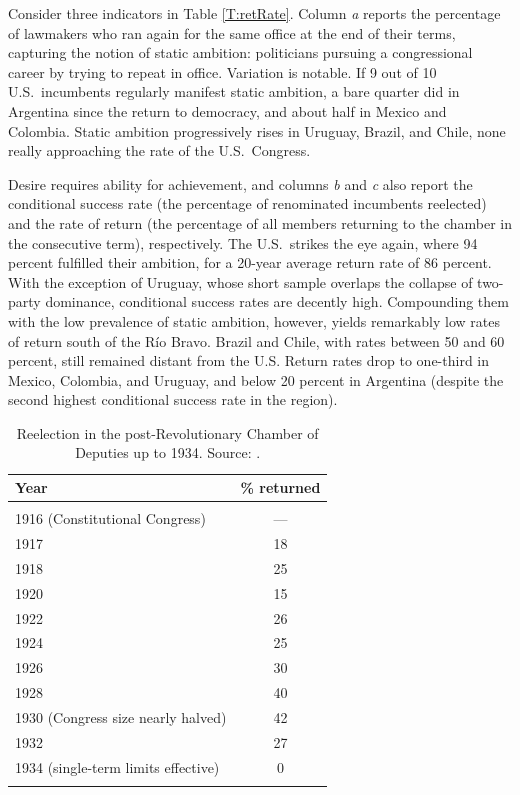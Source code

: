 \documentclass[letter,12pt]{article}
\begin{document}
Consider three indicators in Table \ref{T:retRate}. Column \emph{a} reports the percentage of lawmakers who ran again for the same office at the end of their terms, capturing the notion of static ambition: politicians pursuing a congressional career by trying to repeat in office. Variation is notable. If 9 out of 10 U.S.\ incumbents regularly manifest static ambition, a bare quarter did in Argentina since the return to democracy, and about half in Mexico and Colombia. Static ambition progressively rises in Uruguay, Brazil, and Chile, none really approaching the rate of the U.S.\ Congress. 

Desire requires ability for achievement, and columns \emph{b} and \emph{c} also report the conditional success rate (the percentage of renominated incumbents reelected) and the rate of return (the percentage of all members returning to the chamber in the consecutive term), respectively. The U.S.\ strikes the eye again, where 94 percent fulfilled their ambition, for a 20-year average return rate of 86 percent. With the exception of Uruguay, whose short sample overlaps the collapse of two-party dominance, conditional success rates are decently high. Compounding them with the low prevalence of static ambition, however, yields remarkably low rates of return south of the Río Bravo. Brazil and Chile, with rates between 50 and 60 percent, still remained distant from the U.S. Return rates drop to one-third in Mexico, Colombia, and Uruguay, and below 20 percent in Argentina (despite the second highest conditional success rate in the region). 

\begin{table}
  \centering
  \begin{tabular}{lc}
    Year &  \% returned  \\ \hline \\ [-1.25ex]
    1916 (Constitutional Congress) &          --- \\
    1917 &           18 \\
    1918 &           25 \\
    1920 &           15 \\
    1922 &           26 \\
    1924 &           25 \\
    1926 &           30 \\
    1928 &           40 \\
    1930 (Congress size nearly halved) &           42 \\
    1932 &           27 \\
    1934 (single-term limits effective) &            0 \\ [-1.25ex] \\ \hline
  \end{tabular}
  \caption{Reelection in the post-Revolutionary Chamber of Deputies up to 1934. Source: \citet{godoy.reeleccion.2014}.}\label{T:1920s}
\end{table}
\end{document}
